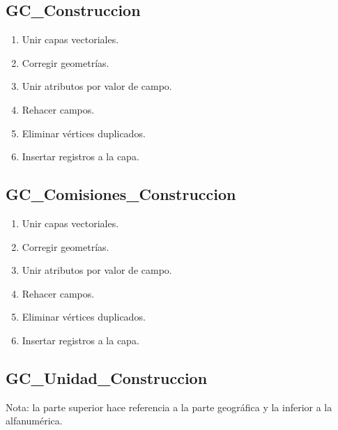 \documentclass[letterpaper,10pt,spanish]{sphinxmanual}
\begin{document}
\subsection{GC\_Construccion}
\label{\detokenize{ETL_SNC/Model:gc-construccion}}\begin{enumerate}
%
\item {} 
Unir capas vectoriales.

\item {} 
Corregir geometrías.

\item {} 
Unir atributos por valor de campo.

\item {} 
Rehacer campos.

\item {} 
Eliminar vértices duplicados.

\item {} 
Insertar registros a la capa.


\end{enumerate}


\subsection{GC\_Comisiones\_Construccion}
\label{\detokenize{ETL_SNC/Model:gc-comisiones-construccion}}\begin{enumerate}
%
\item {} 
Unir capas vectoriales.

\item {} 
Corregir geometrías.

\item {} 
Unir atributos por valor de campo.

\item {} 
Rehacer campos.

\item {} 
Eliminar vértices duplicados.

\item {} 
Insertar registros a la capa.


\end{enumerate}


\subsection{GC\_Unidad\_Construccion}
\label{\detokenize{ETL_SNC/Model:gc-unidad-construccion}}
Nota: la parte superior hace referencia a la parte geográfica y la inferior a la alfanumérica.
\end{document}
